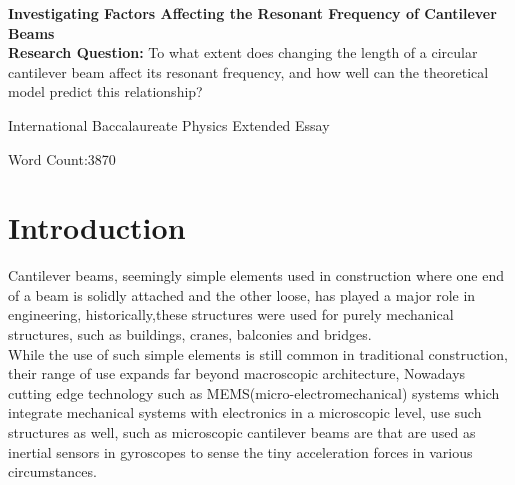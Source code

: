 \documentclass[a4paper,12pt]{article}
\newcommand{\ResearchQ}{To what extent does changing the length of a circular cantilever beam affect its resonant frequency, and how well can the theoretical model predict this relationship?}
\begin{document}
\begin{titlepage}
    \begin{center}
        \vspace*{1cm}

        \large{\textbf{Investigating Factors Affecting the Resonant Frequency of Cantilever Beams}}\\

        \vspace{.5cm}
        \textbf{Research Question:}
        \ResearchQ

        \vspace{0.5cm}
        International Baccalaureate Physics Extended Essay

        \vfill

        \vspace{0.8cm}

        Word Count:3870


    \end{center}
\end{titlepage}
\tableofcontents
{}
\pagebreak



\section{Introduction}\label{Intro}%

Cantilever beams, seemingly simple elements used in construction where one end of a beam is solidly attached and the other loose, has played a major role in engineering, historically,these structures were used for purely mechanical structures, such as buildings, cranes, balconies and bridges.\autocite{BuildingConstructionBook}\\
While the use of such simple elements is still common in traditional construction, their range of use expands far beyond macroscopic architecture, Nowadays cutting edge technology such as MEMS(micro-electromechanical) systems which integrate mechanical systems with electronics in a microscopic level, use such structures as well, such as microscopic cantilever beams are that are used as inertial sensors in gyroscopes to sense the tiny acceleration forces in various circumstances.\autocite{MemsBook}%
\end{document}
